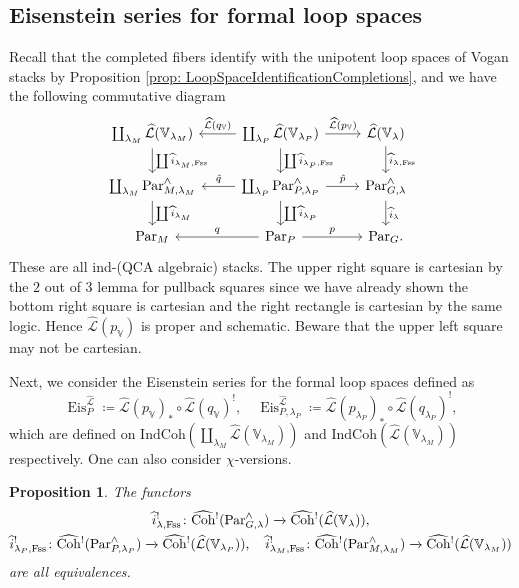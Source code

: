 \documentclass{amsart}
\newtheorem{proposition}[theorem]{Proposition}
\theoremstyle{definition}
\theoremstyle{remark}
\numberwithin{equation}{section}
\newcommand{\mc}{\mathcal}
\newcommand{\wh}{\widehat}
\newcommand{\Par}{\mathrm{Par}}
\newcommand{\IndCoh}{\mathrm{IndCoh}}
\DeclareMathOperator{\Eis}{\mathrm{Eis}}
\newcommand{\Coh}{\mathrm{Coh}}
\newcommand{\V}{\mathbb{V}}
\begin{document}
\subsection{Eisenstein series for formal loop spaces}
Recall that the completed fibers identify with the unipotent loop spaces of Vogan stacks by Proposition \ref{prop: LoopSpaceIdentificationCompletions}, and we have the following commutative diagram
\begin{equation*}
\begin{tikzcd}
\coprod_{\lambda_M}\wh{\mc{L}}(\V_{\lambda_M}) \arrow[d, "\coprod \wh{i}_{\lambda_M ,\mathrm{Fss}}"]  
&\coprod_{\lambda_P}\wh{\mc{L}}(\V_{\lambda_P}) \arrow[l, "\wh{\mc{L}}(q_{\V})"'] \arrow[d, "\coprod \wh{i}_{\lambda_P,\mathrm{Fss}}"] \arrow[r, "\wh{\mc{L}}(p_{\V})"]
&\wh{\mc{L}}(\V_\lambda) \arrow[d, "\wh{i}_{\lambda, \mathrm{Fss}}"]
\\ 
\coprod_{\lambda_M}\Par_{M,\lambda_M}^\wedge \arrow[d, "\coprod \wh{i}_{\lambda_M}"]
&\coprod_{\lambda_P}\Par_{P,\lambda_P}^\wedge \arrow[l, "\hat{q}"'] \arrow[r, "\hat{p}"] \arrow[d, "\coprod \wh{i}_{\lambda_P}"]
&\Par_{G,\lambda}^\wedge \arrow[d, "\wh{i}_{\lambda}"]\\
\Par_M & \Par_P \arrow[r, "p"] \arrow[l, swap, "q"] & \Par_G.
\end{tikzcd}
\end{equation*}
These are all ind-(QCA algebraic) stacks. 
The upper right square is cartesian by the $2$ out of $3$ lemma for pullback squares since we have already shown the bottom right square is cartesian and the right rectangle is cartesian by the same logic. Hence $\wh{\mc{L}}(p_\V)$ is proper and schematic. Beware that the upper left square may not be cartesian. 

Next, we consider the Eisenstein series for the formal loop spaces defined as
\[
\Eis_{P}^{\wh{\mc{L}}} \coloneq \wh{\mc{L}}(p_\V)_* \circ \wh{\mc{L}}(q_\V)^!, \quad
\Eis_{P,\lambda_P}^{\wh{\mc{L}}} \coloneq \wh{\mc{L}}(p_{\lambda_P})_* \circ \wh{\mc{L}}(q_{\lambda_P})^!,
\]
which are defined on $\IndCoh(\coprod_{\lambda_M}\wh{\mc{L}}(\V_{\lambda_M}))$ and $\IndCoh(\wh{\mc{L}}(\V_{\lambda_M}))$ respectively. One can also consider $\chi$-versions. 


\begin{proposition}{\label{prop: unipvsformal}}
The functors
\begin{gather}\label{eq: unip vs formal}
\wh{i}_{\lambda, \mathrm{Fss}}^{!}\colon \wh{\Coh}{}^! (\Par_{G,\lambda}^\wedge) \xrightarrow{}
\wh{\Coh}{}^{!} (\wh{\mc{L}}(\V_\lambda)), \\ 
\wh{i}_{\lambda_P, \mathrm{Fss}}^{!}\colon\wh{\Coh}{}^! (\Par_{P,\lambda_P}^\wedge) \xrightarrow{}
\wh{\Coh}{}^! (\wh{\mc{L}}(\V_{\lambda_P})), \quad
\wh{i}_{\lambda_M,\mathrm{Fss}}^{!}\colon\wh{\Coh}{}^! (\Par_{M,\lambda_M}^\wedge) \xrightarrow{}
\wh{\Coh}{}^! (\wh{\mc{L}}(\V_{\lambda_M}))
\notag
\end{gather}
are all equivalences. 
\end{proposition}
\end{document}
